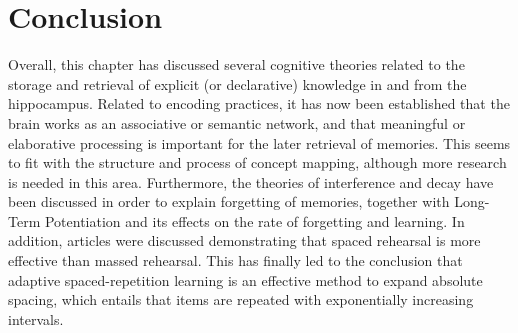 \section{Conclusion}

Overall, this chapter has discussed several cognitive theories related to the storage and retrieval of explicit (or declarative) knowledge in and from the hippocampus. Related to encoding practices, it has now been established that the brain works as an associative or semantic network, and that meaningful or elaborative processing is important for the later retrieval of memories. This seems to fit with the structure and process of concept mapping, although more research is needed in this area. Furthermore, the theories of interference and decay have been discussed in order to explain forgetting of memories, together with Long-Term Potentiation and its effects on the rate of forgetting and learning. In addition, articles were discussed demonstrating that spaced rehearsal is more effective than massed rehearsal. This has finally led to the conclusion that adaptive spaced-repetition learning is an effective method to expand absolute spacing, which entails that items are repeated with exponentially increasing intervals.
